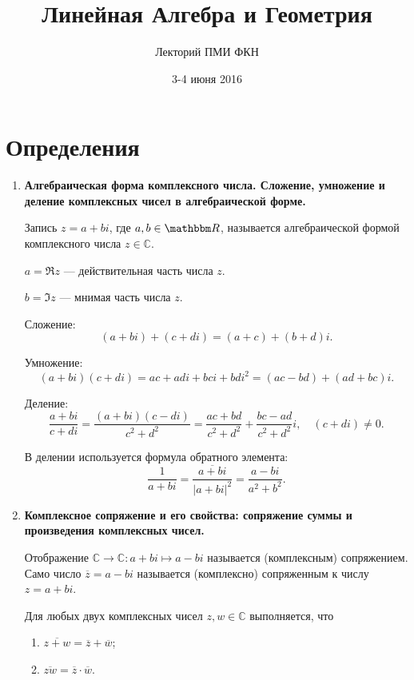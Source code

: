 

\title{Линейная Алгебра и Геометрия}
\author{Лекторий ПМИ ФКН}
\date{3-4 июня 2016}


\maketitle

\section{Определения}

\begin{enumerate}
\item \textbf{Алгебраическая форма комплексного числа. Сложение, умножение и деление комплексных чисел в алгебраической форме.}

Запись $z = a + bi$, где $a, b \in \R$, называется алгебраической формой комплексного числа $z \in \mathbb{C}$.

$a = \Re z$ — действительная часть числа $z$.

$b = \Im z$ — мнимая часть числа $z$.

Сложение: $$ (a + bi) + (c + di) = (a + c) + (b + d)i.$$

Умножение: $$(a + bi)(c + di) = ac + adi + bci + bdi^2 = (ac - bd) + (ad + bc)i.$$

Деление: $$\frac{a + bi}{c + di} = \frac{(a + bi)(c - di)}{c^2 + d^2} = \frac{ac + bd}{c^2 + d^2} + \frac{bc - ad}{c^2 + d^2}i, \quad (c + di) \neq 0.$$

В делении используется формула обратного элемента:
$$
\frac{1}{a + bi} = \frac{\overline{a + bi}}{|a + bi|^2} = \frac{a - bi}{a^2 + b^2}.
$$

\item \textbf{Комплексное сопряжение и его свойства: сопряжение суммы и произведения комплексных чисел.}

Отображение $\mathbb{C} \rightarrow \mathbb{C} : a + bi \mapsto a - bi$ называется (комплексным) сопряжением. Само число $\overline{z} = a - bi$ называется (комплексно) сопряженным к числу $z = a + bi$. 

Для любых двух комплексных чисел $z, w \in \mathbb{C}$ выполняется, что
\begin{enumerate}
\item $\overline{z + w} = \overline{z} + \overline{w}$;
\item $\overline{zw} = \overline{z} \cdot \overline{w}$.
\end{enumerate}


\end{enumerate}
